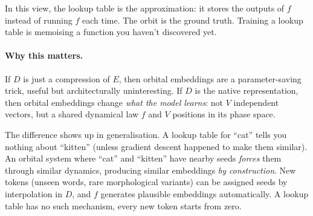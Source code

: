 \documentclass[11pt, a4paper]{article}
\theoremstyle{remark}
\begin{document}
In this view, the lookup table is the approximation:
it stores the outputs of $f$ instead of running $f$ each time.
The orbit is the ground truth.
Training a lookup table is memoising a function you haven't discovered yet.

\paragraph{Why this matters.}
If $D$ is just a compression of $E$, then orbital embeddings are a parameter-saving trick, 
useful but architecturally uninteresting.
If $D$ is the native representation, then orbital embeddings change \emph{what the model learns}:
not $V$ independent vectors, but a shared dynamical law $f$ and $V$ positions in its phase space.

The difference shows up in generalisation.
A lookup table for ``cat'' tells you nothing about ``kitten'' (unless gradient descent
happened to make them similar).
An orbital system where ``cat'' and ``kitten'' have nearby seeds \emph{forces} them through
similar dynamics, producing similar embeddings \emph{by construction}.
New tokens (unseen words, rare morphological variants) can be assigned seeds by interpolation
in $D$, and $f$ generates plausible embeddings automatically.
A lookup table has no such mechanism, every new token starts from zero.
\end{document}
